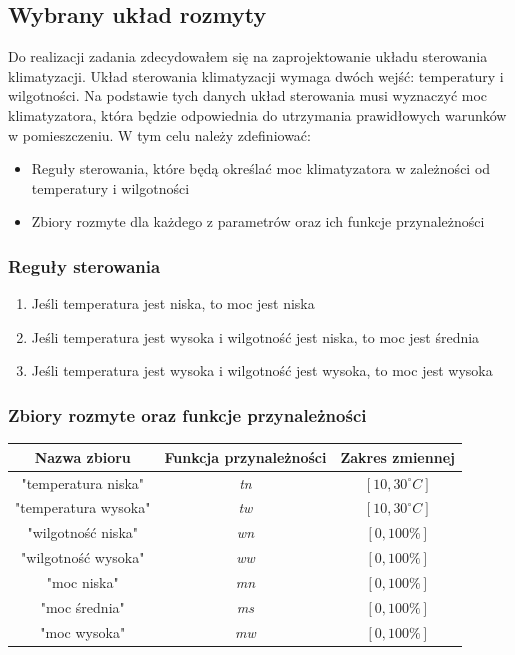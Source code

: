 \documentclass{article}
\begin{document}
\subsection{Wybrany układ rozmyty}

Do realizacji zadania zdecydowałem się na zaprojektowanie
układu sterowania klimatyzacji. Układ sterowania klimatyzacji
wymaga dwóch wejść: temperatury i wilgotności. Na podstawie
tych danych układ sterowania musi wyznaczyć moc klimatyzatora,
która będzie odpowiednia do utrzymania prawidłowych warunków
w pomieszczeniu. W tym celu należy zdefiniować:
\begin{itemize}
    \item Reguły sterowania, które będą określać moc klimatyzatora
    w zależności od temperatury i wilgotności
    \item Zbiory rozmyte dla każdego z parametrów oraz 
    ich funkcje przynależności
\end{itemize}

\subsubsection*{Reguły sterowania}

\begin{enumerate}[label=Reguła \arabic*:, leftmargin=*]
    \item Jeśli temperatura jest niska, to moc jest niska
    \item Jeśli temperatura jest wysoka i wilgotność jest niska, to moc jest średnia
    \item Jeśli temperatura jest wysoka i wilgotność jest wysoka, to moc jest wysoka
\end{enumerate}

\subsubsection*{Zbiory rozmyte oraz funkcje przynależności}

\begin{table}[H]
    \centering
    \begin{tabular}{|c|c|c|}
        \hline
        \textbf{Nazwa zbioru} & \textbf{Funkcja przynależności} & \textbf{Zakres zmiennej} \\
        \hline
        "temperatura niska" & \textit{tn} & $[10, 30 ^\circ C]$ \\
        "temperatura wysoka" & \textit{tw} & $[10, 30 ^\circ C]$ \\
        "wilgotność niska" & \textit{wn} & $[0, 100 \%]$ \\
        "wilgotność wysoka" & \textit{ww} & $[0, 100 \%]$ \\
        "moc niska" & \textit{mn} & $[0, 100 \%]$ \\
        "moc średnia" & \textit{ms} & $[0, 100 \%]$ \\
        "moc wysoka" & \textit{mw} & $[0, 100 \%]$ \\
        \hline
    \end{tabular}
\end{table}
\end{document}
